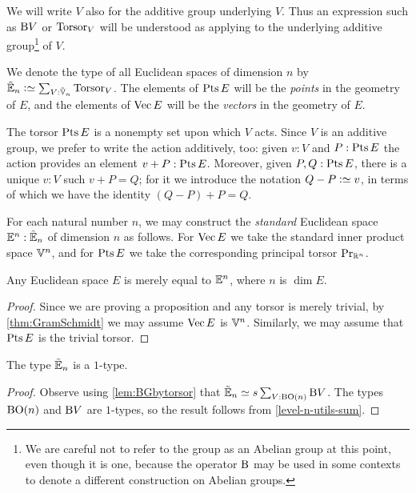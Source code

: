 We will write $V$ also for the additive group underlying $V$.  Thus an
expression such as $\mathrm{B} V$ or $\mathrm{Torsor}_V$ will be understood as applying to
the underlying additive group\footnote{We are careful not to refer to the group
  as an Abelian group at this point, even though it is one, because the
  operator $\mathrm{B}$ may be used in some contexts to denote a different construction
  on Abelian groups.}
of $V$.

We denote the type of all Euclidean spaces of dimension $n$ by $\ES_n \defeq
\sum_{V:\OS_n} \typetorsor_V$.  The elements of $\Points E$ will be the {\em
  points} in the geometry of $E$, and the elements of $\Vectors E$ will be the
    {\em vectors} in the geometry of $E$.

The torsor $\Points E$ is a nonempty set upon which $V$ acts.  Since $V$ is an
additive group, we prefer to write the action additively, too: given $v:V$ and
$P:\Points E$ the action provides an element $v+P:\Points E$.  Moreover, given
$P,Q:\Points E$, there is a unique $v:V$ such $v+P = Q$; for it we introduce
the notation $Q-P \defeq v$, in terms of which we have the identity
$(Q-P)+P=Q$.

For each natural number $n$, we may construct the {\em standard} Euclidean
space $\mathbb E^n : {\tilde {\mathbb E}}_n$ of dimension $n$ as follows.  For $\Vectors E$ we take the
standard inner product space $\mathbb V^n$, and for $\Points E$ we take the
corresponding principal torsor $\mathrm{Pr}_{{\mathbb{R}^n}}$.

\begin{theorem}\label{thm:EuclideanNormalization}
  Any Euclidean space $E$ is merely equal to $\mathbb E^n$, where $n$ is $\dim E$.
\end{theorem}

\begin{proof}
  Since we are proving a proposition and any torsor is merely trivial, by
  \cref{thm:GramSchmidt} we may assume $\Vectors E$ is $\mathbb V^n$.  Similarly, we
  may assume that $\Points E$ is the trivial torsor.
\end{proof}

\begin{lemma}\label{lem:EuclideanSpace1Type}
  The type ${\tilde {\mathbb E}}_n$ is a $1$-type.
\end{lemma}

\begin{proof}
  Observe using \cref{lem:BGbytorsor} that ${\tilde {\mathbb E}}_n \simeq s\sum_{V:\mathrm{B} \mathrm{O}(n)}
  \mathrm{B} V$.  The types $\mathrm{B} \mathrm{O}(n)$ and $\mathrm{B} V$ are $1$-types, so the result
  follows from \cref{level-n-utils-sum}.
\end{proof}

